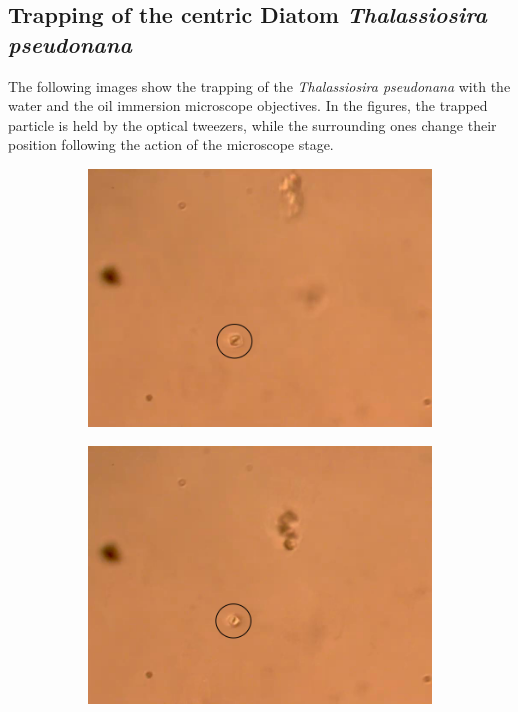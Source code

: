 \documentclass[letterpaper,12pt,oneside]{book}
\begin{document}
\subsection{Trapping of the centric Diatom \textit{Thalassiosira pseudonana}}
The following images show the trapping of the \textit{Thalassiosira pseudonana} with the water and the oil immersion microscope objectives. In the figures, the trapped particle is held by the optical tweezers, while the surrounding ones change their position following the action of the microscope stage. 
\begin{figure}[H] 
  \begin{subfigure}[b]{0.5\linewidth}
    \centering
    \includegraphics[scale=0.28]{Results/Pseudonana water/wpseudona1.png} 
    \caption{}
    \label{fig7:a} 
    \vspace{4ex}
  \end{subfigure}%
  \begin{subfigure}[b]{0.5\linewidth}
    \centering
    \includegraphics[scale=0.28]{Results/Pseudonana water/wpseudonana2.png} 

\end{subfigure}
\end{figure}
\end{document}
